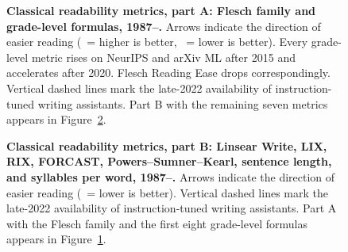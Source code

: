 \begin{figure}[htbp]
\vspace{2mm}

\caption{\textbf{Classical readability metrics, part A: Flesch
  family and grade-level formulas, 1987--.}
  Arrows indicate the direction of easier reading
  (\textuparrow\ = higher is better, \textdownarrow\ = lower is
  better). Every grade-level metric rises on NeurIPS and arXiv
  ML after 2015 and accelerates after 2020. Flesch Reading Ease
  drops correspondingly. Vertical dashed lines mark the
  late-2022 availability of instruction-tuned writing
  assistants. Part B with the remaining seven metrics appears in
  Figure~\ref{fig:app-readability-b}.}
\label{fig:app-readability}
\end{figure}

\begin{figure}[htbp]
\centering
{}

\caption{\textbf{Classical readability metrics, part B: Linsear
  Write, LIX, RIX, FORCAST, Powers--Sumner--Kearl, sentence
  length, and syllables per word, 1987--.}
  Arrows indicate the direction of easier reading
  (\textdownarrow\ = lower is better). Vertical dashed lines mark
  the late-2022 availability of instruction-tuned writing
  assistants. Part A with the Flesch family and the first eight
  grade-level formulas appears in
  Figure~\ref{fig:app-readability}.}
\label{fig:app-readability-b}
\end{figure}
